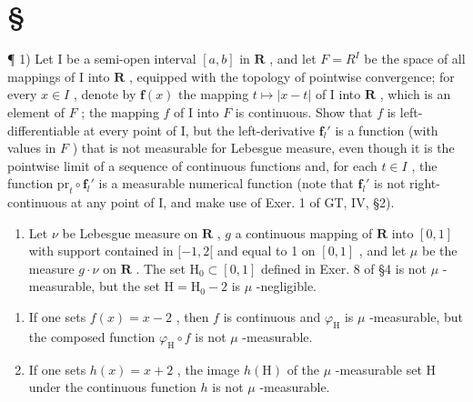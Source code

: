\section*{\texorpdfstring{\S\CurrentExerciseGroup}{Section \CurrentExerciseGroup}}
{}

¶ 1) Let I be a semi-open interval \([a, b]\) in \(\mathbf{R}\) , and let \(F = R^I\) be the space of all mappings of I into \(\mathbf{R}\) , equipped with the topology of pointwise convergence; for every \(x \in I\) , denote by \(\mathbf{f}(x)\) the mapping \(t \mapsto |x - t|\) of I into \(\mathbf{R}\) , which is an element of \(F\) ; the mapping \(f\) of I into \(F\) is continuous. Show that \(f\) is left-differentiable at every point of I, but the left-derivative \(\mathbf{f}_l'\) is a function (with values in \(F\) ) that is not measurable for Lebesgue measure, even though it is the pointwise limit of a sequence of continuous functions and, for each \(t \in I\) , the function \(\text{pr}_t \circ \mathbf{f}_l'\) is a measurable numerical function (note that \(\mathbf{f}_l'\) is not right-continuous at any point of I, and make use of Exer. 1 of GT, IV, §2).

\begin{enumerate}
\def\labelenumi{\arabic{enumi})}
\setcounter{enumi}{1}
\tightlist
\item
  Let \(\nu\) be Lebesgue measure on \(\mathbf{R}\) , \(g\) a continuous mapping of \(\mathbf{R}\) into \([0,1]\) with support contained in \([-1,2[\) and equal to 1 on \([0,1]\) , and let \(\mu\) be the measure \(g \cdot \nu\) on \(\mathbf{R}\) . The set \(\mathrm{H}_0 \subset [0,1]\) defined in Exer. 8 of §4 is not \(\mu\) -measurable, but the set \(\mathrm{H} = \mathrm{H}_0 - 2\) is \(\mu\) -negligible.
\end{enumerate}

\begin{enumerate}
\def\labelenumi{\alph{enumi})}
\item
  If one sets \(f(x) = x - 2\) , then \(f\) is continuous and \(\varphi_{\mathrm{H}}\) is \(\mu\) -measurable, but the composed function \(\varphi_{\mathrm{H}} \circ f\) is not \(\mu\) -measurable.
\item
  If one sets \(h(x) = x + 2\) , the image \(h(\mathrm{H})\) of the \(\mu\) -measurable set \(\mathrm{H}\) under the continuous function \(h\) is not \(\mu\) -measurable.
\end{enumerate}

